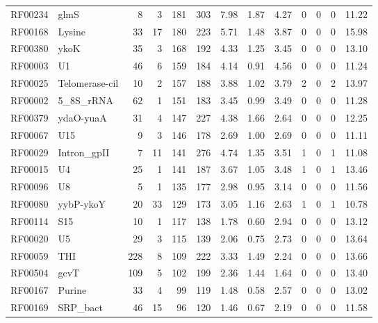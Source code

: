 \begin{table}
\begin{center}
\begin{tabular}{|ll|rr|rr|r|rr|rrrr|}
RF00234 & glmS            &     8 &     3 &   181 & 303 &   7.98 &   1.87 &   4.27 &   0 &  0 &  0 &  11.22 \\
RF00168 & Lysine          &    33 &    17 &   180 & 223 &   5.71 &   1.48 &   3.87 &   0 &  0 &  0 &  15.98 \\
RF00380 & ykoK            &    35 &     3 &   168 & 192 &   4.33 &   1.25 &   3.45 &   0 &  0 &  0 &  13.10 \\
RF00003 & U1              &    46 &     6 &   159 & 184 &   4.14 &   0.91 &   4.56 &   0 &  0 &  0 &  11.24 \\
RF00025 & Telomerase-cil  &    10 &     2 &   157 & 188 &   3.88 &   1.02 &   3.79 &   2 &  0 &  2 &  13.97 \\
RF00002 & 5\_8S\_rRNA     &    62 &     1 &   151 & 183 &   3.45 &   0.99 &   3.49 &   0 &  0 &  0 &  11.28 \\
RF00379 & ydaO-yuaA       &    31 &     4 &   147 & 227 &   4.38 &   1.66 &   2.64 &   0 &  0 &  0 &  12.25 \\
RF00067 & U15             &     9 &     3 &   146 & 178 &   2.69 &   1.00 &   2.69 &   0 &  0 &  0 &  11.11 \\
RF00029 & Intron\_gpII    &     7 &    11 &   141 & 276 &   4.74 &   1.35 &   3.51 &   1 &  0 &  1 &  11.08 \\
RF00015 & U4              &    25 &     1 &   141 & 187 &   3.67 &   1.05 &   3.48 &   1 &  0 &  1 &  13.46 \\
RF00096 & U8              &     5 &     1 &   135 & 177 &   2.98 &   0.95 &   3.14 &   0 &  0 &  0 &  11.56 \\
RF00080 & yybP-ykoY       &    20 &    33 &   129 & 173 &   3.05 &   1.16 &   2.63 &   1 &  0 &  1 &  10.78 \\
RF00114 & S15             &    10 &     1 &   117 & 138 &   1.78 &   0.60 &   2.94 &   0 &  0 &  0 &  13.12 \\
RF00020 & U5              &    29 &     3 &   115 & 139 &   2.06 &   0.75 &   2.73 &   0 &  0 &  0 &  13.64 \\
RF00059 & THI             &   228 &     8 &   109 & 222 &   3.33 &   1.49 &   2.24 &   0 &  0 &  0 &  13.66 \\
RF00504 & gcvT            &   109 &     5 &   102 & 199 &   2.36 &   1.44 &   1.64 &   0 &  0 &  0 &  13.40 \\
RF00167 & Purine          &    33 &     4 &    99 & 119 &   1.48 &   0.58 &   2.57 &   0 &  0 &  0 &  13.02 \\
RF00169 & SRP\_bact       &    46 &    15 &    96 & 120 &   1.46 &   0.67 &   2.19 &   0 &  0 &  0 &  11.58 \\

\end{tabular}
\end{center}
\end{table}

